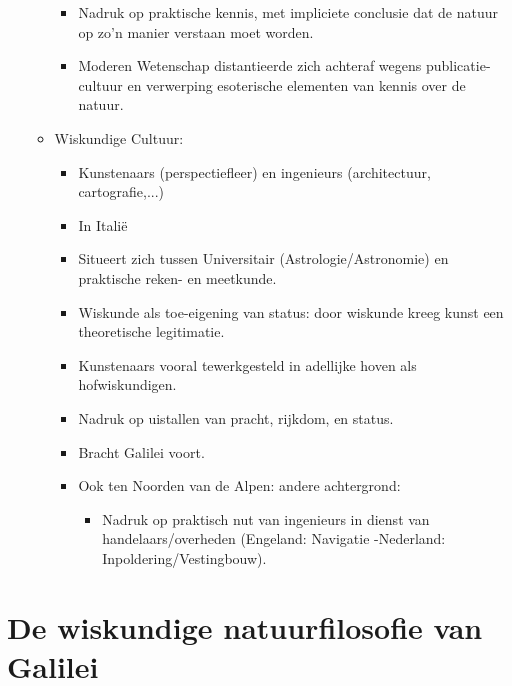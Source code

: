 \documentclass{article}
\begin{document}
\begin{itemize}
\begin{itemize}
\begin{itemize}
        \item Nadruk op praktische kennis, met impliciete conclusie dat de natuur op zo'n manier verstaan moet worden.
        \item Moderen Wetenschap distantieerde zich achteraf wegens publicatie-cultuur en verwerping esoterische elementen van kennis over de natuur.
      \end{itemize}
      \item Wiskundige Cultuur:
      \begin{itemize}
        \item Kunstenaars (perspectiefleer) en ingenieurs (architectuur, cartografie,...)
        \item In Itali\"e
        \item Situeert zich tussen Universitair (Astrologie/Astronomie) en praktische reken- en meetkunde.
        \item Wiskunde als toe-eigening van status: door wiskunde kreeg kunst een theoretische legitimatie.
        \item Kunstenaars vooral tewerkgesteld in adellijke hoven als hofwiskundigen.
        \item Nadruk op uistallen van pracht, rijkdom, en status.
        \item Bracht Galilei voort.
        \item Ook ten Noorden van de Alpen: andere achtergrond:
        \begin{itemize}
          \item Nadruk op praktisch nut van ingenieurs in dienst van handelaars/overheden (Engeland: Navigatie -Nederland: Inpoldering/Vestingbouw).
        \end{itemize} 
      \end{itemize}
    \end{itemize}
  \end{itemize}

  \newpage
  \section{De wiskundige natuurfilosofie van Galilei}

  \newpage
\end{document}
